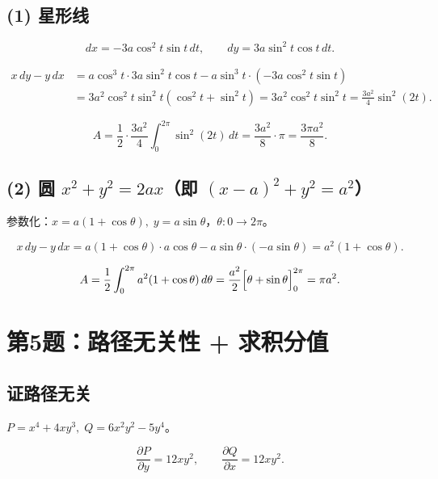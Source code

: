 \documentclass[12pt,a4paper]{ctexart}
\newcommand{\answerbox}[1]{%
  \begin{center}\fbox{\color{red}\large\bfseries #1}\end{center}}
\begin{document}
\subsection*{(1) 星形线}

\[
dx=-3a\cos^2t\sin t\,dt,\qquad dy=3a\sin^2t\cos t\,dt.
\]

\[
\begin{aligned}
x\,dy-y\,dx &= a\cos^3t\cdot3a\sin^2t\cos t - a\sin^3t\cdot(-3a\cos^2t\sin t) \\
           &= 3a^2\cos^2t\sin^2t(\cos^2t+\sin^2t)
            = 3a^2\cos^2t\sin^2t
            = \frac{3a^2}{4}\sin^2(2t).
\end{aligned}
\]

\[
A = \frac{1}{2}\cdot\frac{3a^2}{4}\int_0^{2\pi}\sin^2(2t)\,dt
   = \frac{3a^2}{8}\cdot\pi
   = \frac{3\pi a^2}{8}.
\]

\subsection*{(2) 圆 $x^2+y^2=2ax$（即 $(x-a)^2+y^2=a^2$）}

参数化：$x=a(1+\cos\theta),\;y=a\sin\theta$，$\theta:0\to2\pi$。

\[
x\,dy-y\,dx = a(1+\cos\theta)\cdot a\cos\theta - a\sin\theta\cdot(-a\sin\theta)
            = a^2(1+\cos\theta).
\]

\[
A = \frac{1}{2}\int_0^{2\pi} a^2(1+\cos\theta)\,d\theta
   = \frac{a^2}{2}\Bigl[\theta+\sin\theta\Bigr]_0^{2\pi}
   = \pi a^2.
\]

\answerbox{$A_1 = \dfrac{3\pi a^2}{8},\qquad A_2 = \pi a^2$}

\section{第5题：路径无关性 + 求积分值}


\subsection*{证路径无关}

$P=x^4+4xy^3,\;Q=6x^2y^2-5y^4$。

\[
\frac{\partial P}{\partial y}=12xy^2,\qquad
\frac{\partial Q}{\partial x}=12xy^2.
\]
\end{document}
